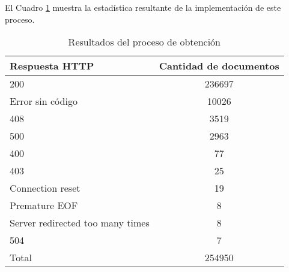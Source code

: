 \noindent El Cuadro \ref{table:ObtencionResults} muestra la estadística resultante de la implementación de este proceso.
\begin{table}[h]
\begin{tabular}{| l | c | }\hline
   Respuesta HTTP & Cantidad de documentos \\\hline
   200 & 236697 \\
   Error sin código & 10026 \\
   408 & 3519 \\
   500 & 2963 \\
   400 & 77 \\
   403 & 25 \\
   Connection reset & 19 \\
   Premature EOF & 8 \\
   Server redirected too many times & 8 \\
   504 & 7 \\\hline
   Total & 254950 \\\hline
 \end{tabular}
\caption{Resultados del proceso de obtención}
\label{table:ObtencionResults}
\end{table}
